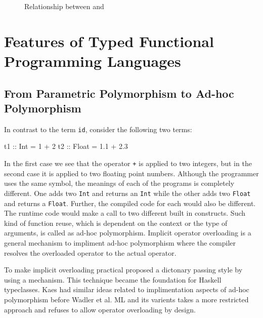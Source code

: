 \documentclass[manuscript,screen,nonacm]{acmart}
\begin{document}
\begin{figure}[ht]
  \centering
  \caption{Relationship between \SF and \SOPL}
  \label{fig:sf-p2-relation}
\end{figure}

\section{Features of Typed Functional Programming Languages}

\subsection{From Parametric Polymorphism to Ad-hoc Polymorphism}
In contrast to the term \lstinline{id}, consider the following two terms:
\begin{code}
    t1 :: Int = 1 + 2
    t2 :: Float = 1.1 + 2.3
\end{code}

In the first case we see that the operator \lstinline{+} is applied to two integers, but in the second case it is applied to two floating point numbers. Although the programmer uses the same symbol, the meanings of each of the programs is completely different. One adds two \lstinline{Int} and returns an \lstinline{Int} while the other adds two \lstinline{Float} and returns a \lstinline{Float}. Further, the compiled code for each would also be different. The runtime code would make a call to two different built in constructs. Such kind of function reuse, which is dependent on the context or the type of arguments, is called as ad-hoc polymorphism\cite{strachey_fundamental_2000}. Implicit operator overloading is a general mechanism to impliment ad-hoc polymorphism where the compiler resolves the overloaded operator to the actual operator.

To make implicit overloading practical \citet{wadler_polymorphism_1989} proposed a dictonary passing style by using a mechanism. This technique became the foundation for Haskell\cite{haskell_2010} typeclasses. Kaes had similar ideas related to implimentation aspects of ad-hoc polymorphism before Wadler et al. ML and its varients\cite{milner_definition_1997,leroy_ocaml_2023} takes a more restricted approach and refuses to allow operator overloading by design.
\end{document}
